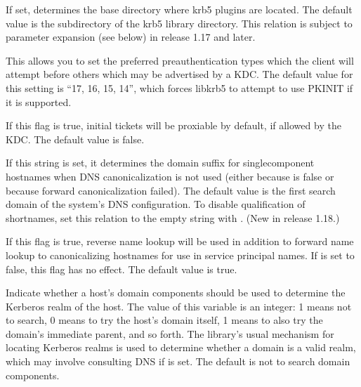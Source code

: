 \documentclass[letterpaper,10pt,english]{sphinxmanual}
\begin{document}
\begin{description}
\sphinxAtStartPar
If set, determines the base directory where krb5 plugins are
located.  The default value is the  subdirectory
of the krb5 library directory.  This relation is subject to
parameter expansion (see below) in release 1.17 and later.

\sphinxAtStartPar
This allows you to set the preferred preauthentication types which
the client will attempt before others which may be advertised by a
KDC.  The default value for this setting is “17, 16, 15, 14”,
which forces libkrb5 to attempt to use PKINIT if it is supported.

\sphinxAtStartPar
If this flag is true, initial tickets will be proxiable by
default, if allowed by the KDC.  The default value is false.

\sphinxAtStartPar
If this string is set, it determines the domain suffix for
single\sphinxhyphen{}component hostnames when DNS canonicalization is not used
(either because  is false or because
forward canonicalization failed).  The default value is the first
search domain of the system’s DNS configuration.  To disable
qualification of shortnames, set this relation to the empty string
with .  (New in release 1.18.)

\sphinxAtStartPar
If this flag is true, reverse name lookup will be used in addition
to forward name lookup to canonicalizing hostnames for use in
service principal names.  If  is set
to false, this flag has no effect.  The default value is true.

\sphinxAtStartPar
Indicate whether a host’s domain components should be used to
determine the Kerberos realm of the host.  The value of this
variable is an integer: \sphinxhyphen{}1 means not to search, 0 means to try the
host’s domain itself, 1 means to also try the domain’s immediate
parent, and so forth.  The library’s usual mechanism for locating
Kerberos realms is used to determine whether a domain is a valid
realm, which may involve consulting DNS if  is
set.  The default is not to search domain components.


\end{description}
\end{document}
